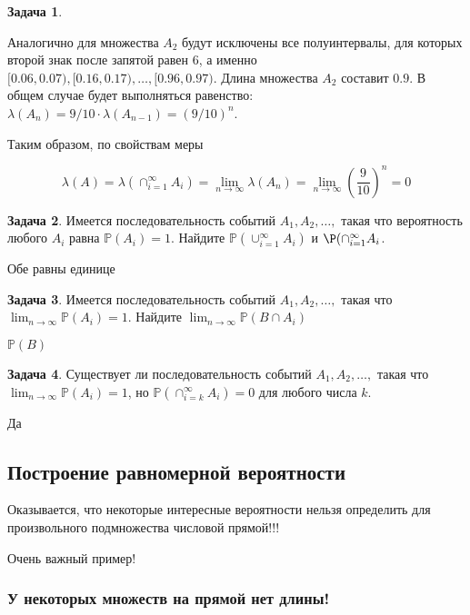 \documentclass[pdftex, 12pt, a4paper]{article}
\def \mbb{\mathbb}
\def \PP{\mbb{P}}
\renewcommand{\to}{\rightarrow}
\theoremstyle{definition} %
\newtheorem{problem}{Задача}
\numberwithin{problem}{section}
\numberwithin{blits}{section}
\begin{document}
\begin{problem}
\begin{sol}
Аналогично для множества $A_2$ будут исключены все полуинтервалы, для которых второй знак после запятой равен 6, а именно $[0.06,0.07),[0.16,0.17), \ldots, [0.96,0.97)$. Длина множества $A_2$ составит $0.9$. В общем случае будет выполняться равенство: $\lambda(A_n) = 9/10 \cdot \lambda(A_{n-1}) = (9/10)^n$.

Таким образом, по свойствам меры 

\[ \lambda(A) = \lambda(\cap_{i=1}^{\infty} A_i) = \lim_{n\to \infty} \lambda(A_n) = \lim_{n \to \infty} \left(\frac{9}{10} \right)^n = 0\]
\end{sol}
\end{problem}

\begin{problem}
Имеется последовательность событий $A_1, A_2, \ldots,$ такая что вероятность любого $A_i$ равна $\PP(A_i) = 1$. Найдите $\PP(\cup_{i=1}^{\infty} A_i)$ и $\P( \cap_{i=1}^{\infty} A_i$.
\begin{sol}
Обе равны единице
\end{sol}
\end{problem}

\begin{problem}
Имеется последовательность событий $A_1, A_2, \ldots,$ такая что $\displaystyle \lim_{n \to \infty} \PP(A_i) = 1$. Найдите $\displaystyle \lim_{n \to \infty} \PP(B \cap A_i )$
\begin{sol}
$\PP(B)$
\end{sol}
\end{problem}

\begin{problem}
Существует ли последовательность событий $A_1, A_2, \ldots,$ такая что $\displaystyle \lim_{n \to \infty} \PP(A_i) = 1$, но $\PP( \cap_{i=k}^{\infty} A_i) = 0$ для любого числа $k$.
\begin{sol}
Да
\end{sol}
\end{problem}




\subsection{Построение равномерной вероятности}

Оказывается, что некоторые интересные вероятности нельзя определить для произвольного подмножества числовой прямой!!!

Очень важный пример!

\subsubsection*{У некоторых множеств на прямой нет длины!}
\end{document}

